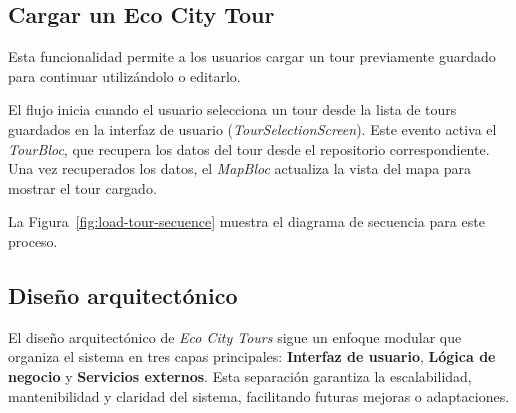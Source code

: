 \subsection{Cargar un Eco City Tour}
Esta funcionalidad permite a los usuarios cargar un tour previamente guardado para continuar utilizándolo o editarlo.

El flujo inicia cuando el usuario selecciona un tour desde la lista de tours guardados en la interfaz de usuario (\textit{TourSelectionScreen}). Este evento activa el \textit{TourBloc}, que recupera los datos del tour desde el repositorio correspondiente. Una vez recuperados los datos, el \textit{MapBloc} actualiza la vista del mapa para mostrar el tour cargado. 

La Figura~\ref{fig:load-tour-secuence} muestra el diagrama de secuencia para este proceso.



\subsection{Diseño arquitectónico}

El diseño arquitectónico de \textit{Eco City Tours} sigue un enfoque modular que organiza el sistema en tres capas principales: \textbf{Interfaz de usuario}, \textbf{Lógica de negocio} y \textbf{Servicios externos}. Esta separación garantiza la escalabilidad, mantenibilidad y claridad del sistema, facilitando futuras mejoras o adaptaciones.

